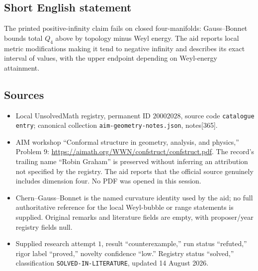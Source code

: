 \documentclass[11pt]{article}
\begin{document}
\subsection{Short English statement}
The printed positive-infinity claim fails on closed four-manifolds: Gauss--Bonnet bounds total \(Q_4\) above by topology minus Weyl energy. The aid reports local metric modifications making it tend to negative infinity and describes its exact interval of values, with the upper endpoint depending on Weyl-energy attainment.
\subsection{Sources}
\begin{itemize}
\item Local UnsolvedMath registry, permanent ID \(20002028\), source code \texttt{catalogue entry}; canonical collection \texttt{aim-geometry-notes.json}, notes[365].
\item AIM workshop ``Conformal structure in geometry, analysis, and physics,'' Problem \(9\): \url{https://aimath.org/WWN/confstruct/confstruct.pdf}. The record's trailing name ``Robin Graham'' is preserved without inferring an attribution not specified by the registry. The aid reports that the official source genuinely includes dimension four. No PDF was opened in this session.
\item Chern--Gauss--Bonnet is the named curvature identity used by the aid; no full authoritative reference for the local Weyl-bubble or range statements is supplied. Original remarks and literature fields are empty, with proposer/year registry fields null.
\item Supplied research attempt \(1\), result ``counterexample,'' run status ``refuted,'' rigor label ``proved,'' novelty confidence ``low.'' Registry status ``solved,'' classification \texttt{SOLVED-IN-LITERATURE}, updated 14 August 2026.
\end{itemize}
\end{document}
